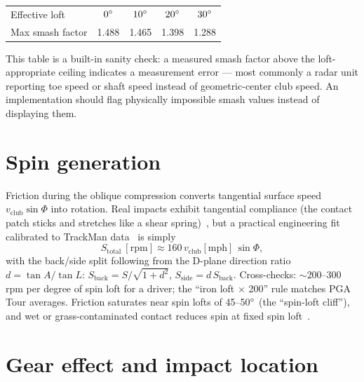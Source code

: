 \begin{center}
\small
\begin{tabular}{@{}lcccc@{}}
\toprule
Effective loft & $0\si{\degree}$ & $10\si{\degree}$ & $20\si{\degree}$ & $30\si{\degree}$ \\
Max smash factor & 1.488 & 1.465 & 1.398 & 1.288 \\
\bottomrule
\end{tabular}
\end{center}

\begin{keypoint}
This table is a built-in sanity check: a measured smash factor above the
loft-appropriate ceiling indicates a measurement error --- most commonly a
radar unit reporting toe speed or shaft speed instead of
geometric-center club speed. An implementation should flag physically impossible
smash values instead of displaying them.
\end{keypoint}

\section{Spin generation}
\label{sec:spingen}

Friction during the oblique compression converts tangential surface speed
$v_{\mathrm{club}}\sin\Phi$ into rotation. Real impacts exhibit tangential
compliance (the contact patch sticks and stretches like a shear
spring)~\cite{mdpifriction,crossoblique}, but a practical engineering fit
calibrated to TrackMan data~\cite{tutelman3d} is simply
\begin{equation}
\label{eq:spinrate}
S_{\mathrm{total}}\ [\mathrm{rpm}] \approx
  160\, v_{\mathrm{club}}[\mathrm{mph}]\, \sin\Phi ,
\end{equation}
with the back/side split following from the D-plane direction ratio
$d = \tan A/\tan L$:
$S_{\mathrm{back}} = S/\sqrt{1+d^2}$, $S_{\mathrm{side}} = d\,S_{\mathrm{back}}$.
Cross-checks: $\sim$200--300\,rpm per degree of spin loft for a driver;
the ``iron loft $\times$ 200'' rule matches PGA Tour averages. Friction
saturates near spin lofts of 45--50$\si{\degree}$ (the ``spin-loft cliff''), and
wet or grass-contaminated contact reduces spin at fixed spin
loft~\cite{trackmanspinloft}.

\section{Gear effect and impact location}
\label{sec:gear}

